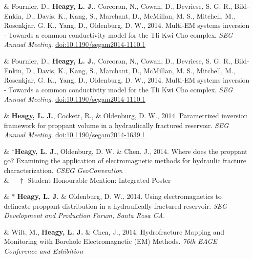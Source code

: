 \documentclass[a4paper, 11pt]{article}
\newcommand{\doi}[1]{\href{https://doi.org/#1}{doi:#1}}
\begin{document}
\begin{entryright}
& Fournier, D., \textbf{Heagy, L. J.}, Corcoran, N., Cowan, D., Devriese, S. G. R., Bild-Enkin, D., Davis, K., Kang, S., Marchant, D., McMillan, M. S., Mitchell, M., Rosenkjar, G. K., Yang, D., Oldenburg, D. W., 2014. Multi-EM systems inversion - Towards a common conductivity model for the Tli Kwi Cho complex. \emph{SEG Annual Meeting}. \doi{10.1190/segam2014-1110.1}
\end{entryright}

\begin{entryright}
& Fournier, D., \textbf{Heagy, L. J.}, Corcoran, N., Cowan, D., Devriese, S. G. R., Bild-Enkin, D., Davis, K., Kang, S., Marchant, D., McMillan, M. S., Mitchell, M., Rosenkjar, G. K., Yang, D., Oldenburg, D. W., 2014. Multi-EM systems inversion - Towards a common conductivity model for the Tli Kwi Cho complex. \emph{SEG Annual Meeting}. \doi{10.1190/segam2014-1110.1}
\end{entryright}

\begin{entryright}
& \textbf{Heagy, L. J.}, Cockett, R., \& Oldenburg, D. W., 2014. Parametrized inversion framework for proppant volume in a hydraulically fractured reservoir. \emph{SEG Annual Meeting}. \doi{10.1190/segam2014-1639.1}
\end{entryright}

\begin{entryright}
& $\dagger$\textbf{Heagy, L. J.}, Oldenburg, D. W. \& Chen, J., 2014. Where does the proppant go? Examining the application of electromagnetic methods for hydraulic fracture characterization. \emph{CSEG GeoConvention} \\
& $\quad \dagger$ Student Honourable Mention: Integrated Poster
\end{entryright}

\begin{entryright}
& $*$ \textbf{Heagy, L. J.} \& Oldenburg, D. W., 2014. Using electromagnetics to delineate proppant distribution in a hydraulically fractured reservoir. \emph{SEG Development and Production Forum, Santa Rosa CA}.
\end{entryright}

\begin{entryright}
& Wilt, M., \textbf{Heagy, L. J.} \& Chen, J., 2014. Hydrofracture Mapping and Monitoring with Borehole Electromagnetic (EM) Methods. \emph{76th EAGE Conference and Exhibition}
\end{entryright}
\end{document}

